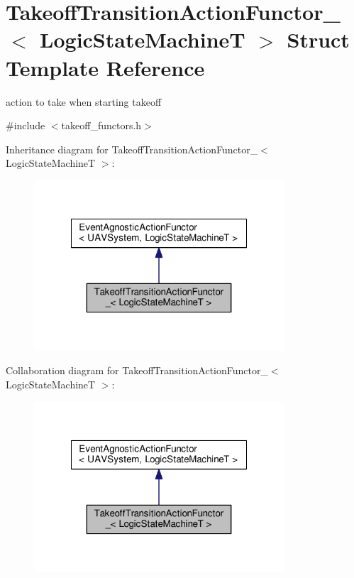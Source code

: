 \hypertarget{structTakeoffTransitionActionFunctor__}{\section{Takeoff\-Transition\-Action\-Functor\-\_\-$<$ Logic\-State\-Machine\-T $>$ Struct Template Reference}
\label{structTakeoffTransitionActionFunctor__}
}


action to take when starting takeoff  




{\ttfamily \#include $<$takeoff\-\_\-functors.\-h$>$}



Inheritance diagram for Takeoff\-Transition\-Action\-Functor\-\_\-$<$ Logic\-State\-Machine\-T $>$\-:\nopagebreak
\begin{figure}[H]
\begin{center}
\leavevmode
\includegraphics[width=264pt]{structTakeoffTransitionActionFunctor____inherit__graph}
\end{center}
\end{figure}


Collaboration diagram for Takeoff\-Transition\-Action\-Functor\-\_\-$<$ Logic\-State\-Machine\-T $>$\-:\nopagebreak
\begin{figure}[H]
\begin{center}
\leavevmode
\includegraphics[width=264pt]{structTakeoffTransitionActionFunctor____coll__graph}
\end{center}
\end{figure}
